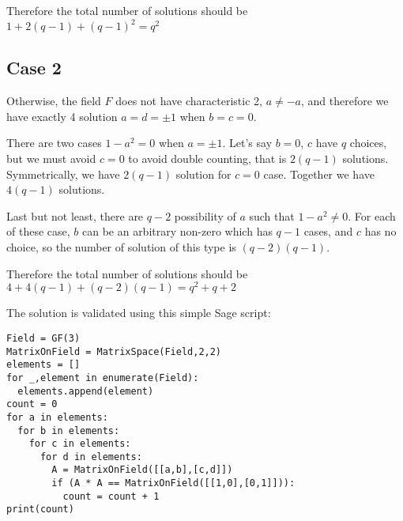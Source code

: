 Therefore the total number of solutions should be $ 1 + 2(q - 1) + (q - 1)^2 = q^2 $

\subsection*{Case 2}
Otherwise, the field $ F $ does not have characteristic 2, $ a \ne -a $, and therefore we have exactly 4 solution $ a = d = \pm 1 $ when $ b = c = 0 $.

There are two cases $ 1 - a^2 = 0 $ when $ a = \pm 1 $. Let's say $ b = 0 $, $ c $ have $ q $ choices, but we must avoid $ c = 0 $ to avoid double counting, that is $ 2(q - 1) $ solutions. Symmetrically, we have $ 2(q - 1) $ solution for $ c = 0 $ case. Together we have $ 4(q - 1) $ solutions.

Last but not least, there are $ q - 2 $ possibility of $ a $ such that $ 1 - a^2 \ne 0 $. For each of these case, $ b $ can be an arbitrary non-zero which has $ q - 1 $ cases, and $ c $ has no choice, so the number of solution of this type is $ (q - 2)(q - 1) $.

Therefore the total number of solutions should be $ 4 + 4(q - 1) + (q - 2)(q - 1) = q^2 + q + 2 $

The solution is validated using this simple Sage script:
\begin{verbatim}
Field = GF(3)
MatrixOnField = MatrixSpace(Field,2,2)
elements = []
for _,element in enumerate(Field):
  elements.append(element)
count = 0
for a in elements:
  for b in elements:
    for c in elements:
      for d in elements:
        A = MatrixOnField([[a,b],[c,d]])
        if (A * A == MatrixOnField([[1,0],[0,1]])):
          count = count + 1
print(count)
\end{verbatim}